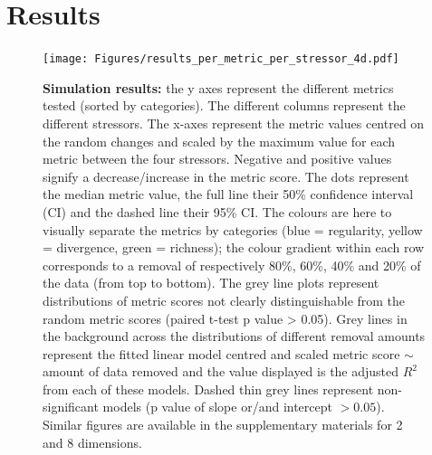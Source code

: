 \documentclass[12pt,letterpaper]{article}
\begin{document}

















\section{Results}


\begin{figure}[!htbp]
\centering
   \texttt{[image: Figures/results\_per\_metric\_per\_stressor\_4d.pdf]}
\caption{\scriptsize{\textbf{Simulation results:} the y axes represent the different metrics tested (sorted by categories).
The different columns represent the different stressors. The x-axes represent the metric values centred on the random changes and scaled by the maximum value for each metric between the four stressors.
Negative and positive values signify a decrease/increase in the metric score.
The dots represent the median metric value, the full line their 50\% confidence interval (CI) and the dashed line their 95\% CI.
The colours are here to visually separate the metrics by categories (blue = regularity, yellow = divergence, green = richness); the colour gradient within each row corresponds to a removal of respectively 80\%, 60\%, 40\% and 20\% of the data (from top to bottom).
The grey line plots represent distributions of metric scores not clearly distinguishable from the random metric scores (paired t-test p value > 0.05).
Grey lines in the background across the distributions of different removal amounts represent the fitted linear model centred and scaled metric score $\sim$ amount of data removed and the value displayed is the adjusted $R^2$ from each of these models.
Dashed thin grey lines represent non-significant models (p value of slope or/and intercept $> 0.05$).
Similar figures are available in the supplementary materials for 2 and 8 dimensions.}}
\label{Fig:simulation_results}
\end{figure}
\bigskip
\end{document}

